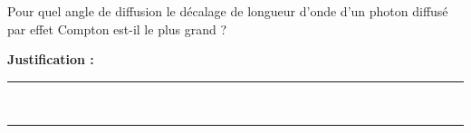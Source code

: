 Pour quel angle de diffusion le décalage de longueur d'onde d'un photon diffusé par effet Compton est-il le plus grand ?

\choices

\noindent\textbf{Justification :} \hrulefill \\[2.5ex]
\rule{\linewidth}{0.4pt} \\[2.5ex]
\rule{\linewidth}{0.4pt}
\vfill
